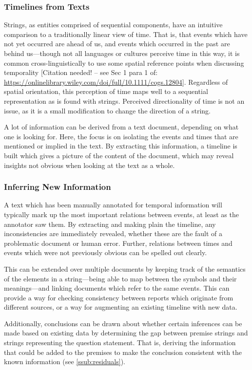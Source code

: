 \documentclass[a4paper,12pt,leqno]{article}
\newcommand{\citeneeded}[1][]{{\color{red}[Citation needed!#1]}}
\begin{document}
\subsubsection{Timelines from Texts}\label{ssub:timelines}
Strings, as entities comprised of sequential components, have an intuitive comparison to a traditionally linear view of time. That is, that events which have not yet occurred are ahead of us, and events which occurred in the past are behind us---though not all languages or cultures perceive time in this way, it is common cross-linguistically to use some spatial reference points when discussing temporality \citeneeded[ -- see Sec 1 para 1 of: \url{https://onlinelibrary.wiley.com/doi/full/10.1111/cogs.12804}]{}. Regardless of spatial orientation, this perception of time maps well to a sequential representation as is found with strings. Perceived directionality of time is not an issue, as it is a small modification to change the direction of a string.

A lot of information can be derived from a text document, depending on what one is looking for. Here, the focus is on isolating the events and times that are mentioned or implied in the text. By extracting this information, a timeline is built which gives a picture of the content of the document, which may reveal insights not obvious when looking at the text as a whole.

\subsubsection{Inferring New Information}\label{ssub:inferring}
A text which has been manually annotated for temporal information will typically mark up the most important relations between events, at least as the annotator saw them. By extracting and making plain the timeline, any inconsistencies are immediately revealed, whether these are the fault of a problematic document or human error. Further, relations between times and events which were not previously obvious can be spelled out clearly.

This can be extended over multiple documents by keeping track of the semantics of the elements in a string---being able to map between the symbols and their meanings---and linking documents which refer to the same events. This can provide a way for checking consistency between reports which originate from different sources, or a way for augmenting an existing timeline with new data.

Additionally, conclusions can be drawn about whether certain inferences can be made based on existing data by determining the gap between premise strings and strings representing the question statement. That is, deriving the information that could be added to the premises to make the conclusion consistent with the known information (see \ref{ssub:residuals}).
\end{document}
